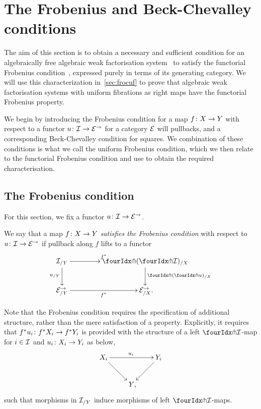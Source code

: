 \documentclass[reqno,10pt,a4paper,oneside,draft]{amsart}
\begin{document}
\section{The Frobenius and Beck-Chevalley conditions}
\label{sec:frobc}


The aim of this section is to obtain a necessary and sufficient condition for an algebraically free algebraic weak
factorisation system~\cite{garner:small-object-argument} to satisfy the functorial Frobenius condition~\cite{garner:topological-simplicial}, expressed purely in terms of its generating category. We will use this characterization 
in~\cref{sec:frocuf} to prove that algebraic weak factorisation systems with uniform fibrations as right maps
have the functorial Frobenius property. 

We begin by introducing the Frobenius condition for a map $f \co X \to Y$ with respect to a functor $u \co \cal{I} \to \catE^\to$ for a category $\cal{E}$ will pullbacks, and a corresponding Beck-Chevalley condition for squares. We combination of these conditions is what we call the uniform Frobenius condition, which we then relate to the functorial Frobenius
condition and use to obtain the required characterisation. 


\subsection*{The Frobenius condition}

For this section, we fix a functor $u \co \cal{I} \to \catE^\to$.

\begin{definition} \label{thm:frobenius-def}
We say that a map $f \co X \to Y$ \emph{satisfies the Frobenius condition} with respect to $u \co \cal{I} \to \cal{E}^\to$ if pullback along $f$ lifts to a functor
\[
\xymatrix@C=1.5cm{
  \cal{I}_{/Y}
  \ar[r]^{f^*}
  \ar[d]_{u_{/Y}}
&
  \liftl{(\liftr{\cal{I}})}_{/X}
  \ar[d]^{\liftl{(\liftr{u})}_{/X}}
\\
  \catE_{/Y}^\to \ar[r]_{f^*}
&
  \catE_{/X}^\to
\rlap{.}}
\]
\end{definition}

\begin{remark} \label{frobenius-no-coherence}
Note that the Frobenius condition requires the specification of additional structure, rather than the mere satisfaction of a property. Explicitly,  it requires that $f^* u_i \co f^* X_i \to f^* Y_i$ is provided with the structure of a left $\liftr{\cal{I}}$-map for $i \in \cal{I}$ and $u_i \co X_i \to Y_i$ as below,
\[
\xymatrix{
  X_i
  \ar[dr]
  \ar[rr]^{u_i}
&&
  Y_i
  \ar[dl]
\\&
   Y
\rlap{,}}
\]
such that morphisms in $\cal{I}_{/Y}$ induce morphisms of left $\liftr{\cal{I}}$-maps.
\end{remark}
\end{document}
